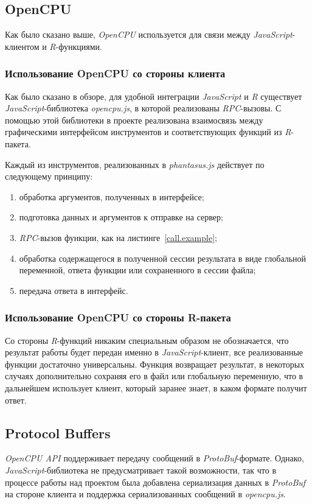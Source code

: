 \subsection{OpenCPU}\label{opencpuusage}
Как было сказано выше, \emph{OpenCPU} используется для связи между \emph{JavaScript}-клиентом и \emph{R}-функциями.

\subsubsection{Использование OpenCPU со стороны клиента}\label{functioncallalgo}
Как было сказано в обзоре, для удобной интеграции \emph{JavaScript} и \emph{R} существует \emph{JavaScript}-библиотека \emph{opencpu.js}, в которой реализованы \emph{RPC}-вызовы. С помощью этой библиотеки в проекте реализована взаимосвязь между графическими интерфейсом инструментов и соответствующих функций из \emph{R}-пакета.

Каждый из инструментов, реализованных в \emph{phantasus.js} действует по следующему принципу:\begin{enumerate}
\item обработка аргументов, полученных в интерфейсе;
\item подготовка данных и аргументов к отправке на сервер;
\item \emph{RPC}-вызов функции, как на листинге~\ref{call.example};
\item обработка содержащегося в полученной сессии результата в виде глобальной переменной, ответа функции или сохраненного в сессии файла;
\item передача ответа в интерфейс.
\end{enumerate}

\subsubsection{Использование OpenCPU со стороны R-пакета}
Со стороны \emph{R}-функций никаким специальным образом не обозначается, что результат работы будет передан именно в \emph{JavaScript}-клиент, все реализованные функции достаточно универсальны.
Функция возвращает результат, в некоторых случаях дополнительно сохраняя его в файл или глобальную переменную, что в дальнейшем использует клиент, который заранее знает, в каком формате получит ответ. 

\subsection{Protocol Buffers}
\emph{OpenCPU API} поддерживает передачу сообщений в \emph{ProtoBuf}-формате. Однако, \emph{JavaScript}-библиотека не предусматривает такой возможности, так что в процессе работы над проектом была добавлена сериализация данных в \emph{ProtoBuf} на стороне клиента и поддержка сериализованных сообщений в \emph{opencpu.js}. 
